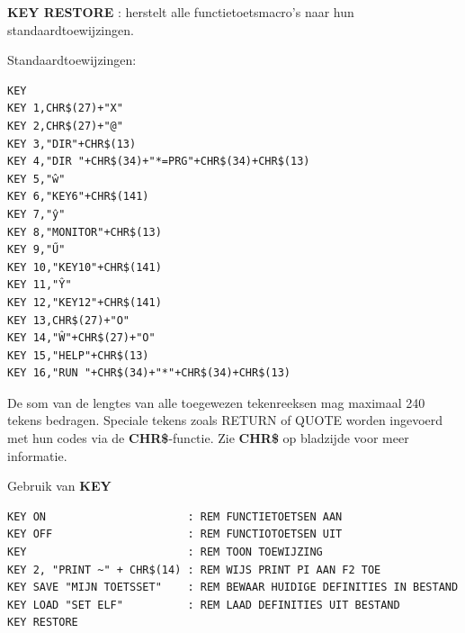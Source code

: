 \begin{description}[leftmargin=2cm,style=nextline]
                  {\bf KEY RESTORE} : herstelt alle functietoetsmacro's naar hun standaardtoewijzingen.

                  Standaardtoewijzingen:

\begin{tcolorbox}[colback=black,coltext=white]
\verbatimfont{\codefont}
\begin{verbatim}
KEY
KEY 1,CHR$(27)+"X"
KEY 2,CHR$(27)+"@"
KEY 3,"DIR"+CHR$(13)
KEY 4,"DIR "+CHR$(34)+"*=PRG"+CHR$(34)+CHR$(13)
KEY 5,"ŵ"
KEY 6,"KEY6"+CHR$(141)
KEY 7,"ŷ"
KEY 8,"MONITOR"+CHR$(13)
KEY 9,"Ű"
KEY 10,"KEY10"+CHR$(141)
KEY 11,"Ŷ"
KEY 12,"KEY12"+CHR$(141)
KEY 13,CHR$(27)+"O"
KEY 14,"Ŵ"+CHR$(27)+"O"
KEY 15,"HELP"+CHR$(13)
KEY 16,"RUN "+CHR$(34)+"*"+CHR$(34)+CHR$(13)
\end{verbatim}
\end{tcolorbox}

\item [Opmerkingen:]  De som van de lengtes van alle toegewezen tekenreeksen mag maximaal 240 tekens bedragen. Speciale tekens zoals RETURN of QUOTE worden ingevoerd met hun codes via de {\bf CHR\$}-functie. Zie {\bf CHR\$} op bladzijde \pageref{BASIC 65 Functions!CHR} voor meer informatie.

\item [Voorbeelden:] Gebruik van {\bf KEY}

\begin{tcolorbox}[colback=black,coltext=white]
\verbatimfont{\codefont}
\begin{verbatim}
KEY ON                      : REM FUNCTIETOETSEN AAN
KEY OFF                     : REM FUNCTIOTOETSEN UIT
KEY                         : REM TOON TOEWIJZING
KEY 2, "PRINT ~" + CHR$(14) : REM WIJS PRINT PI AAN F2 TOE
KEY SAVE "MIJN TOETSSET"    : REM BEWAAR HUIDIGE DEFINITIES IN BESTAND
KEY LOAD "SET ELF"          : REM LAAD DEFINITIES UIT BESTAND
KEY RESTORE
\end{verbatim}
\end{tcolorbox}
\end{description}


\newpage
